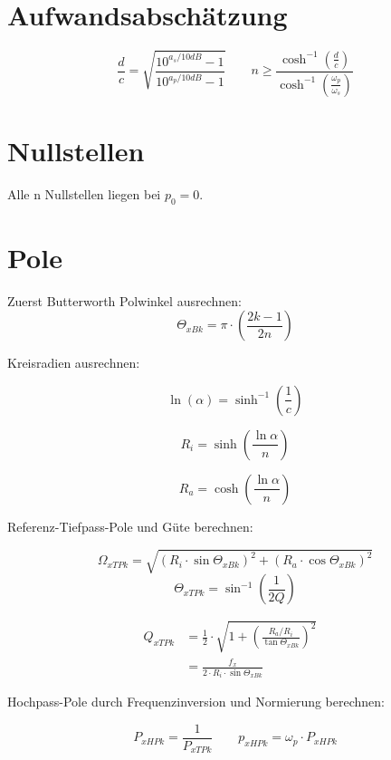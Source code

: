 \documentclass[a4paper, 12pt]{report}
\begin{document}
\vspace{0.8cm}
\begin{minipage}[t]{0.6\textwidth}
	\section*{Aufwandsabschätzung}
	  
	\[ \frac{d}{c} = \sqrt{\frac{10^{a_s/10dB} - 1}{10^{a_p/10dB} - 1}} \qquad n \ge \frac{\cosh^{-1}{\left(\frac{d}{c}\right)}}{\cosh^{-1}{\left(\frac{\omega_p}{\omega_s}\right)}} \]
\end{minipage}
\begin{minipage}[t]{0.4\textwidth}
	\section*{Nullstellen}
		Alle n Nullstellen liegen bei $ p_0 = 0 $.
\end{minipage}
   	
	
\section*{Pole}
	Zuerst Butterworth Polwinkel ausrechnen:		
	\[ \varTheta_{xBk} = \pi \cdot \left( \frac{2k-1}{2n} \right)  \]
	
	Kreisradien ausrechnen:
	
	\begin{minipage}[t]{0.33\textwidth}
		\vspace{-0.5cm}   	
		\[ \ln{(\alpha)} = \sinh^{-1}{\left(\frac{1}{c}\right)} \]
	\end{minipage}
   	\begin{minipage}[t]{0.33\textwidth}
		\[ R_i = \sinh{\left(\frac{\ln{\alpha}}{n}\right)} \]
   	\end{minipage}
   	\begin{minipage}[t]{0.33\textwidth}
		\[ R_a = \cosh{\left(\frac{\ln{\alpha}}{n}\right)} \]
   	\end{minipage}
   	
   	\vspace{0.4cm}
   	Referenz-Tiefpass-Pole und Güte berechnen:
   	\vspace{-0.4cm}
   	
	\begin{minipage}[t]{0.6\textwidth}
		\[ \Omega_{xTPk} = \sqrt{\left(R_i \cdot \sin{\varTheta_{xBk}}\right)^2 + \left(R_a \cdot \cos{\varTheta_{xBk}}\right)^2} \]
		\[ \varTheta_{xTPk} = \sin^{-1}{\left(\frac{1}{2Q}\right)} \]
	\end{minipage}
   	\begin{minipage}[t]{0.4\textwidth}
   		\vspace{-0.3cm}
   		\begin{align*}
   			Q_{xTPk} &= \frac{1}{2} \cdot \sqrt{1+ \left(\frac{R_a / R_i}{\tan{\varTheta_{xBk}}}\right)^2} &\\
   			&= \frac{f_x}{2 \cdot R_i \cdot \sin{\varTheta_{xBk}}} &
   		\end{align*}

   	\end{minipage}
   	
   	\vspace{0.4cm}
   	Hochpass-Pole durch Frequenzinversion und Normierung berechnen:
   	\vspace{-0.2cm}
   	
   	\[ P_{xHPk} = \frac{1}{P_{xTPk}} \qquad p_{xHPk} = \omega_p \cdot P_{xHPk} \]
   	
   	 	
\clearpage
\end{document}
